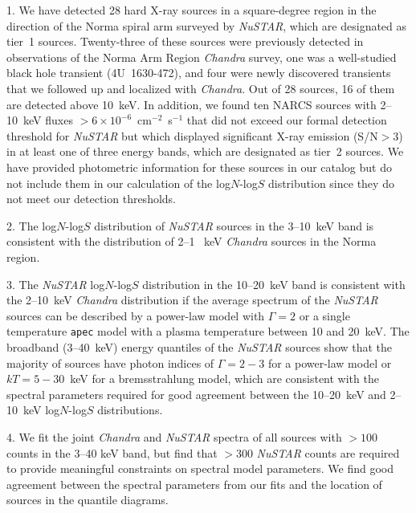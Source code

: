 \documentclass[iop,revtex4]{emulateapj}
\begin{document}
\begin{list}{}{%
\setlength{\topsep}{0pt}%
\setlength{\leftmargin}{0.0in}%
\setlength{\listparindent}{0.0in}%
\setlength{\itemindent}{0.1in}%
\setlength{\parsep}{\parskip}%
\setlength{\itemsep}{4pt}
}%
\item[]
1. We have detected 28 hard X-ray sources in a square-degree region in the direction of the Norma spiral arm surveyed by \textit{NuSTAR}, which are designated as tier~1 sources.  Twenty-three of these sources were previously detected in observations of the Norma Arm Region \textit{Chandra} survey, one was a well-studied black hole transient (4U~1630-472), and four were newly discovered transients that we followed up and localized with \textit{Chandra}.  Out of 28 sources, 16 of them are detected above 10~keV.  In addition, we found ten NARCS sources with 2--10~keV fluxes $>6\times10^{-6}$~cm$^{-2}$~s$^{-1}$ that did not exceed our formal detection threshold for \textit{NuSTAR} but which displayed significant X-ray emission (S/N$> 3$) in at least one of three energy bands, which are designated as tier~2 sources.  We have provided photometric information for these sources in our catalog but do not include them in our calculation of the log$N$-log$S$ distribution since they do not meet our detection thresholds. 
\item[]
2. The log$N$-log$S$ distribution of \textit{NuSTAR} sources in the 3--10~keV band is consistent with the distribution of 2--1~ keV \textit{Chandra} sources in the Norma region. 
\item[]
3. The \textit{NuSTAR} log$N$-log$S$ distribution in the 10--20~keV band is consistent with the 2--10~keV \textit{Chandra} distribution if the average spectrum of the \textit{NuSTAR} sources can be described by a power-law model with $\Gamma=2$ or a single temperature \texttt{apec} model with a plasma temperature between 10 and 20~keV.  The broadband (3--40~keV) energy quantiles of the \textit{NuSTAR} sources show that the majority of sources have photon indices of $\Gamma=2-3$ for a power-law model or $kT=5-30$~keV for a bremsstrahlung model, which are consistent with the spectral parameters required for good agreement between the 10--20~keV and 2--10~keV log$N$-log$S$ distributions. 
\item[]
4.  We fit the joint \textit{Chandra} and \textit{NuSTAR} spectra of all sources with $>100$ counts in the 3--40 keV band, but find that $>300$ \textit{NuSTAR} counts are required to provide meaningful constraints on spectral model parameters.  We find good agreement between the spectral parameters from our fits and the location of sources in the quantile diagrams.

\end{list}
\end{document}
